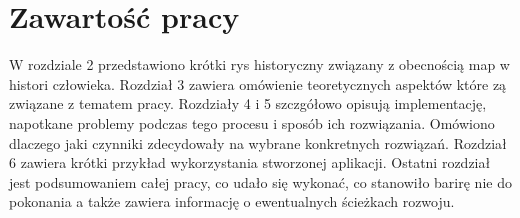 \section{Zawartość pracy}
\label{sec:zawartoscPracy}


W rozdziale 2 przedstawiono krótki rys historyczny związany z obecnością map w histori człowieka. Rozdział 3 zawiera omówienie teoretycznych aspektów które zą związane z tematem pracy. Rozdziały 4 i 5 szczgółowo opisują implementację, napotkane problemy podczas tego procesu i sposób ich rozwiązania. Omówiono dlaczego jaki czynniki zdecydowały na wybrane konkretnych rozwiązań. Rozdział 6 zawiera krótki przykład wykorzystania stworzonej aplikacji. Ostatni rozdział jest podsumowaniem całej pracy, co udało się wykonać, co stanowiło barirę nie do pokonania a także zawiera informację o ewentualnych ścieżkach rozwoju.















